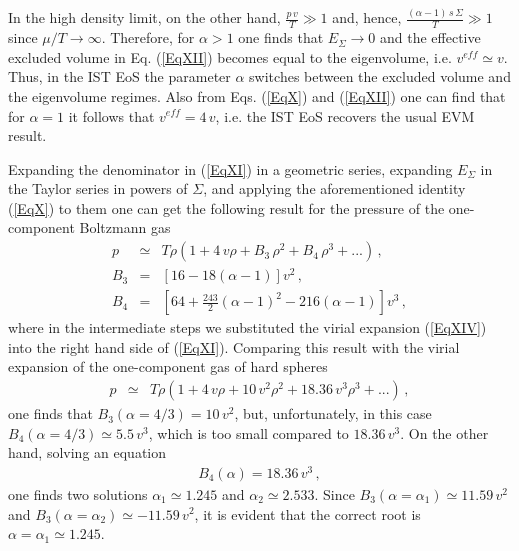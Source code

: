 \documentclass[12pt]{article}
\begin{document}
In the  high density limit, on the other hand, $\frac{p\, v }{T}  \gg 1$ and, hence,
$\frac{(\alpha-1) \, s\, \Sigma }{T}  \gg 1$  since $\mu/T \rightarrow\infty$. Therefore, for $\alpha >1$  one finds that $E_\Sigma \rightarrow 0$ and the effective excluded volume in  Eq. (\ref{EqXII})  becomes equal to the eigenvolume, i.e. $v^{eff} \simeq  v$. Thus, in the IST EoS  the parameter  $\alpha$ switches  between the excluded volume and the eigenvolume regimes.
Also from  Eqs.  (\ref{EqX})  and  (\ref{EqXII})  one can find that for $\alpha =1$ it follows that  $v^{eff} =  4 \,v$, i.e. the IST EoS recovers the usual EVM result. 

Expanding the denominator in (\ref{EqXI})  in a geometric series, expanding $E_\Sigma$  in the Taylor series in powers of $\Sigma$, and applying the aforementioned identity (\ref{EqX})  to them one can get the following result for the pressure of the one-component Boltzmann gas 
\begin{eqnarray}
\label{EqXIV}
%
p & \simeq   & T \rho ( 1 + 4 \, v \rho + B_3 \,\rho^2 + B_4 \, \rho^3 + ...) \,, \\
%
\label{EqXV}
B_3 & = &  \left[16 - 18 (\alpha-1) \right] v^2 \,, \\
 \label{EqXVI}
B_4 & = &  \left[64 + \frac{243}{2}(\alpha-1)^2 - 216 (\alpha-1) \right] v^3 \,,
%
\end{eqnarray}
%
where in the intermediate steps we substituted the virial expansion  (\ref{EqXIV}) into the right hand side of  (\ref{EqXI}). 
Comparing this result with the virial expansion of the one-component gas of  hard spheres \cite{BookLiquids}
\begin{eqnarray}
\label{EqXVII}
%
p & \simeq   & T \rho ( 1 + 4 \, v \rho + 10 \,v^2 \rho^2 + 18.36 \,  v^3  \rho^3 + ...) \,, 
%
\end{eqnarray}
%
one finds that $B_3 (\alpha =4/3) = 10\, v^2$, but, unfortunately, in this case   $B_4 (\alpha =4/3) \simeq 5.5\, v^3$, which is too small compared to $18.36 \,  v^3$. 
On the other hand, solving an equation 
%
\begin{eqnarray}\label{EqXVIII}
B_4 (\alpha) = 18.36 \,  v^3 \,, 
\end{eqnarray}
%
 one finds two solutions $\alpha_1 \simeq 1.245$  and
$\alpha_2 \simeq 2.533$. Since  $B_3 (\alpha =\alpha_1) \simeq 11.59\, v^2$ and $B_3 (\alpha =\alpha_2) \simeq - 11.59\, v^2$,
it is evident that  the correct root is $\alpha=\alpha_1 \simeq 1.245$. 
\end{document}
